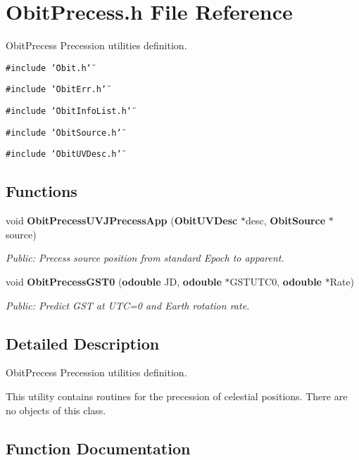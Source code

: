 \section{Obit\-Precess.h File Reference}
\label{ObitPrecess_8h}
Obit\-Precess Precession utilities definition. 

{\tt \#include \char`\"{}Obit.h\char`\"{}}\par
{\tt \#include \char`\"{}Obit\-Err.h\char`\"{}}\par
{\tt \#include \char`\"{}Obit\-Info\-List.h\char`\"{}}\par
{\tt \#include \char`\"{}Obit\-Source.h\char`\"{}}\par
{\tt \#include \char`\"{}Obit\-UVDesc.h\char`\"{}}\par
\subsection*{Functions}
\begin{CompactItemize}
\item 
void {\bf Obit\-Precess\-UVJPrecess\-App} ({\bf Obit\-UVDesc} $\ast$desc, {\bf Obit\-Source} $\ast$source)
\begin{CompactList}\small\item\em Public: Precess source position from standard Epoch to apparent. \item\end{CompactList}\item 
void {\bf Obit\-Precess\-GST0} ({\bf odouble} JD, {\bf odouble} $\ast$GSTUTC0, {\bf odouble} $\ast$Rate)
\begin{CompactList}\small\item\em Public: Predict GST at UTC=0 and Earth rotation rate. \item\end{CompactList}\end{CompactItemize}


\subsection{Detailed Description}
Obit\-Precess Precession utilities definition. 

This utility contains routines for the precession of celestial positions. There are no objects of this class.

\subsection{Function Documentation}
